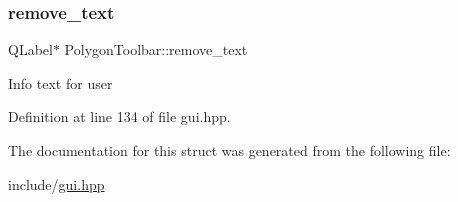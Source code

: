 \subsubsection{\texorpdfstring{remove\+\_\+text}{remove\_text}}
{\footnotesize\ttfamily Q\+Label$\ast$ Polygon\+Toolbar\+::remove\+\_\+text}

Info text for user 

Definition at line 134 of file gui.\+hpp.



The documentation for this struct was generated from the following file\+:\begin{DoxyCompactItemize}
\item 
include/\mbox{\hyperlink{gui_8hpp}{gui.\+hpp}}\end{DoxyCompactItemize}
